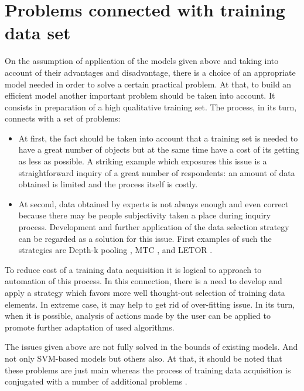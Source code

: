 \documentclass[12pt,a4paper,oneside]{article}
\begin{document}

\section{Problems connected with training data set}
\label{sec:problems_connected_with_training_data_set}

\par
On the assumption of application of the models given above and taking into account of their advantages and disadvantage, there is a choice of an appropriate model needed in order to solve a certain practical problem. 
At that, to build an efficient model another important problem should be taken into account. 
It consists in preparation of a high qualitative training set. 
The process, in its turn, connects with a set of problems:

\begin{itemize}
	\item At first, the fact should be taken into account that a training set is needed to have a great number of objects but at the same time have a cost of its getting as less as possible. 
	A striking example which exposures this issue is a straightforward inquiry of a great number of respondents: an amount of data obtained is limited and the process itself is costly.
	\item At second, data obtained by experts is not always enough and even correct because there may be people subjectivity taken a place during inquiry process. 
	Development and further application of the data selection strategy can be regarded as a solution for this issue. 
	First examples of such the strategies are Depth-k pooling , MTC , and LETOR .
\end{itemize}

\par
To reduce cost of a training data acquisition it is logical to approach to automation of this process. 
In this connection, there is a need to develop and apply a strategy which favors more well thought-out selection of training data elements. 
In extreme case, it may help to get rid of over-fitting issue. 
In its turn, when it is possible, analysis of actions made by the user can be applied to promote further adaptation of used algorithms.

\par
The issues given above are not fully solved in the bounds of existing models. 
And not only SVM-based models but others also. 
At that, it should be noted that these problems are just main whereas the process of training data acquisition is conjugated with a number of additional problems . 
\end{document}
